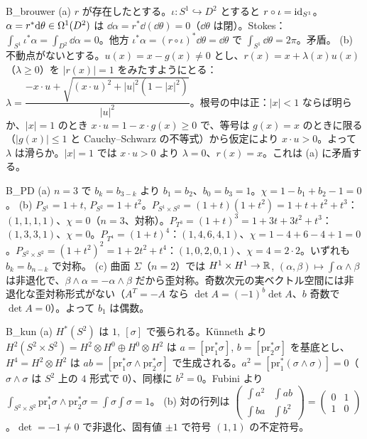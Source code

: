 \begin{soll}{B_brouwer}
(a) $r$ が存在したとする。$\iota:S^1\hookrightarrow D^2$ とすると $r\circ\iota=\mathrm{id}_{S^1}$。$\alpha=r^*\mathrm{d}\theta\in\Omega^1(D^2)$ は $\dd\alpha=r^*\dd(\dd\theta)=0$（$\dd\theta$ は閉）。Stokes：$\int_{S^1}\iota^*\alpha=\int_{D^2}\dd\alpha=0$。他方 $\iota^*\alpha=(r\circ\iota)^*\dd\theta=\dd\theta$ で $\int_{S^1}\dd\theta=2\pi$。矛盾。
(b) 不動点がないとする。$u(x)=x-g(x)\ne0$ とし、$r(x)=x+\lambda(x)u(x)$（$\lambda\ge0$）を $|r(x)|=1$ をみたすようにとる：$\lambda=\dfrac{-x\cdot u+\sqrt{(x\cdot u)^2+|u|^2(1-|x|^2)}}{|u|^2}$。根号の中は正：$|x|<1$ ならば明らか、$|x|=1$ のとき $x\cdot u=1-x\cdot g(x)\ge0$ で、等号は $g(x)=x$ のときに限る（$|g(x)|\le1$ と Cauchy--Schwarz の不等式）から仮定により $x\cdot u>0$。よって $\lambda$ は滑らか。$|x|=1$ では $x\cdot u>0$ より $\lambda=0$、$r(x)=x$。これは (a) に矛盾する。
\end{soll}


\begin{soll}{B_PD}
(a) $n=3$ で $b_k=b_{3-k}$ より $b_1=b_2$、$b_0=b_3=1$。$\chi=1-b_1+b_2-1=0$。
(b) $P_{S^1}=1+t$, $P_{S^2}=1+t^2$。$P_{S^1\times S^2}=(1+t)(1+t^2)=1+t+t^2+t^3$：$(1,1,1,1)$、$\chi=0$（$n=3$、対称）。$P_{T^3}=(1+t)^3=1+3t+3t^2+t^3$：$(1,3,3,1)$、$\chi=0$。$P_{T^4}=(1+t)^4$：$(1,4,6,4,1)$、$\chi=1-4+6-4+1=0$。$P_{S^2\times S^2}=(1+t^2)^2=1+2t^2+t^4$：$(1,0,2,0,1)$、$\chi=4=2\cdot2$。いずれも $b_k=b_{n-k}$ で対称。
(c) 曲面 $\Sigma$（$n=2$）では $H^1\times H^1\to\mathbb R$, $(\alpha,\beta)\mapsto\int\alpha\wedge\beta$ は非退化で、$\beta\wedge\alpha=-\alpha\wedge\beta$ だから歪対称。奇数次元の実ベクトル空間には非退化な歪対称形式がない（$A^T=-A$ なら $\det A=(-1)^b\det A$、$b$ 奇数で $\det A=0$）。よって $b_1$ は偶数。
\end{soll}

\begin{soll}{B_kun}
(a) $H^*(S^2)$ は $1,\ [\sigma]$ で張られる。Künneth より $H^2(S^2\times S^2)=H^2\otimes H^0\oplus H^0\otimes H^2$ は $a=[\mathrm{pr}_1^*\sigma]$, $b=[\mathrm{pr}_2^*\sigma]$ を基底とし、$H^4=H^2\otimes H^2$ は $ab=[\mathrm{pr}_1^*\sigma\wedge\mathrm{pr}_2^*\sigma]$ で生成される。$a^2=[\mathrm{pr}_1^*(\sigma\wedge\sigma)]=0$（$\sigma\wedge\sigma$ は $S^2$ 上の $4$ 形式で $0$）、同様に $b^2=0$。Fubini より $\int_{S^2\times S^2}\mathrm{pr}_1^*\sigma\wedge\mathrm{pr}_2^*\sigma=\int\sigma\int\sigma=1$。
(b) 対の行列は $\begin{pmatrix}\int a^2&\int ab\\\int ba&\int b^2\end{pmatrix}=\begin{pmatrix}0&1\\1&0\end{pmatrix}$。$\det=-1\ne0$ で非退化、固有値 $\pm1$ で符号 $(1,1)$ の不定符号。
\end{soll}

